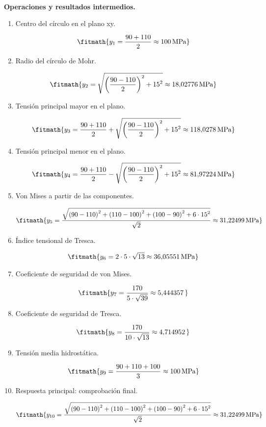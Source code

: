 \noindent\textbf{Operaciones y resultados intermedios.}

\begin{enumerate}

\item Centro del círculo en el plano xy.

\[\fitmath{y_{1}=\frac{90+110}{2}\approx 100\,\mathrm{MPa}}\]

\item Radio del círculo de Mohr.

\[\fitmath{y_{2}=\sqrt{{\left(\frac{90-110}{2}\right)}^{2}+{15}^{2}}\approx 18{,}02776\,\mathrm{MPa}}\]

\item Tensión principal mayor en el plano.

\[\fitmath{y_{3}=\frac{90+110}{2}+\sqrt{{\left(\frac{90-110}{2}\right)}^{2}+{15}^{2}}\approx 118{,}0278\,\mathrm{MPa}}\]

\item Tensión principal menor en el plano.

\[\fitmath{y_{4}=\frac{90+110}{2}-\sqrt{{\left(\frac{90-110}{2}\right)}^{2}+{15}^{2}}\approx 81{,}97224\,\mathrm{MPa}}\]

\item Von Mises a partir de las componentes.

\[\fitmath{y_{5}=\frac{\sqrt{{\left(90-110\right)}^{2}+{\left(110-100\right)}^{2}+{\left(100-90\right)}^{2}+6\cdot {15}^{2}}}{\sqrt{2}}\approx 31{,}22499\,\mathrm{MPa}}\]

\item Índice tensional de Tresca.

\[\fitmath{y_{6}=2\cdot 5\cdot \sqrt{13}\approx 36{,}05551\,\mathrm{MPa}}\]

\item Coeficiente de seguridad de von Mises.

\[\fitmath{y_{7}=\frac{170}{5\cdot \sqrt{39}}\approx 5{,}444357\,}\]

\item Coeficiente de seguridad de Tresca.

\[\fitmath{y_{8}=\frac{170}{10\cdot \sqrt{13}}\approx 4{,}714952\,}\]

\item Tensión media hidrostática.

\[\fitmath{y_{9}=\frac{90+110+100}{3}\approx 100\,\mathrm{MPa}}\]

\item Respuesta principal: comprobación final.

\[\fitmath{y_{10}=\frac{\sqrt{{\left(90-110\right)}^{2}+{\left(110-100\right)}^{2}+{\left(100-90\right)}^{2}+6\cdot {15}^{2}}}{\sqrt{2}}\approx 31{,}22499\,\mathrm{MPa}}\]

\end{enumerate}
